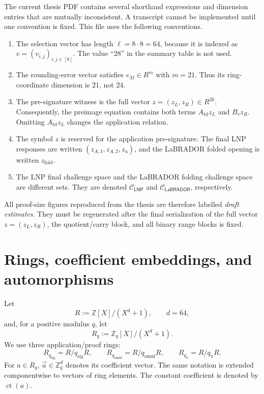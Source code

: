 \documentclass[11pt,a4paper]{article}
\newcommand{\Z}{\mathbb{Z}}
\newcommand{\Rsig}{R_{q_{\mathrm{sig}}}}
\newcommand{\Romuf}{R_{q_{\mathrm{omuf}}}}
\newcommand{\Rpi}{R_{q_{\pi}}}
\newcommand{\sigmod}{q_{\mathrm{sig}}}
\newcommand{\omufmod}{q_{\mathrm{omuf}}}
\newcommand{\proofmod}{q_{\pi}}
\newcommand{\LNP}{\mathsf{LNP}}
\newcommand{\LaB}{\mathsf{LaBRADOR}}
\newcommand{\ct}{\operatorname{ct}}
\newcommand{\vecx}[1]{\overrightarrow{#1}}
\newcommand{\calC}{\mathcal{C}}
\begin{document}
\begin{importantbox}
The current thesis PDF contains several shorthand expressions and dimension
entries that are mutually inconsistent.  A transcript cannot be implemented
until one convention is fixed.  This file uses the following conventions.
\begin{enumerate}
  \item The selection vector has length
  \(\ell=8\cdot 8=64\), because it is indexed as
  \(v=(v_{i,j})_{i,j\in[8]}\).  The value ``28'' in the summary table is not
  used.
  \item The rounding-error vector satisfies \(e_M\in R^{m}\) with \(m=21\).
  Thus its ring-coordinate dimension is \(21\), not \(24\).
  \item The pre-signature witness is the full vector
  \(z=(z_L,z_R)\in R^{2k}\).  Consequently, the preimage equation contains
  both terms \(A_{\mathrm{td}}z_L\) and \(B_vz_R\).  Omitting
  \(A_{\mathrm{td}}z_L\) changes the application relation.
  \item The symbol \(z\) is reserved for the application pre-signature.
  The final LNP responses are written
  \((z_{A,1},z_{A,2},z_u)\), and the LaBRADOR folded opening is written
  \(z_{\mathrm{fold}}\).
  \item The LNP final challenge space and the LaBRADOR folding challenge space
  are different sets.  They are denoted \(\calC_{\LNP}\) and
  \(\calC_{\LaB}\), respectively.
\end{enumerate}
All proof-size figures reproduced from the thesis are therefore labelled
\emph{draft estimates}.  They must be regenerated after the final serialization
of the full vector \(z=(z_L,z_R)\), the quotient/carry block, and all binary
range blocks is fixed.
\end{importantbox}

\section{Rings, coefficient embeddings, and automorphisms}

Let
\[
  R := \Z[X]/(X^d+1), \qquad d=64,
\]
and, for a positive modulus \(q\), let
\[
  R_q := \Z_q[X]/(X^d+1).
\]
We use three application/proof rings:
\[
  \Rsig=R/\sigmod R,\qquad
  \Romuf=R/\omufmod R,\qquad
  \Rpi=R/\proofmod R.
\]
For \(a\in R_q\), \(\vecx a\in\Z_q^d\) denotes its coefficient vector.  The
same notation is extended componentwise to vectors of ring elements.  The
constant coefficient is denoted by \(\ct(a)\).
\end{document}
